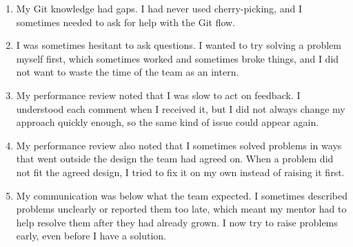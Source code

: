 \begin{enumerate}[label=\arabic*.]
    \item My Git knowledge had gaps. I had never used cherry-picking, and I sometimes needed to ask for help with the Git flow.
    \item I was sometimes hesitant to ask questions. I wanted to try solving a problem myself first, which sometimes worked and sometimes broke things, and I did not want to waste the time of the team as an intern.
    \item My performance review noted that I was slow to act on feedback. I understood each comment when I received it, but I did not always change my approach quickly enough, so the same kind of issue could appear again.
    \item My performance review also noted that I sometimes solved problems in ways that went outside the design the team had agreed on. When a problem did not fit the agreed design, I tried to fix it on my own instead of raising it first.
\item My communication was below what the team expected. I sometimes described problems unclearly or reported them too late, which meant my mentor had to help resolve them after they had already grown. I now try to raise problems early, even before I have a solution.
\end{enumerate}


